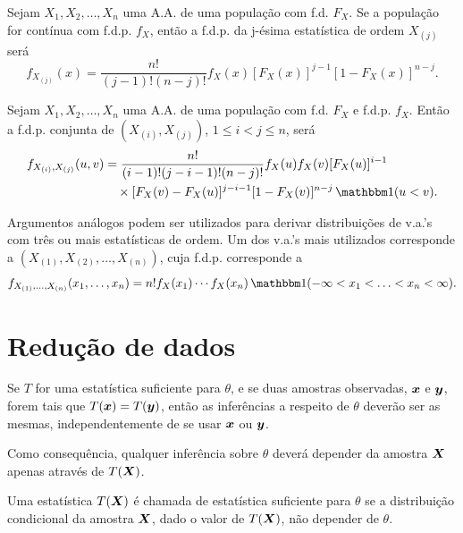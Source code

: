 \begin{theorem}[Contínua]
	Sejam $X_1, X_2, \ldots, X_n$ uma A.A. de uma população com f.d. $F_X$. Se a população for contínua com f.d.p. $f_X$, então a f.d.p. da j-ésima estatística de ordem $X_{(j)}$ será
	\[
	f_{X_{(j)}}(x) = \frac{n!}{(j-1)!(n-j)!} f_X(x) [F_X(x)]^{j-1} [1 - F_X(x)]^{n-j}.
	\]
\end{theorem}

\begin{theorem}[Contínua]
	Sejam $X_1, X_2, \ldots, X_n$ uma A.A. de uma população com f.d. $F_X$ e f.d.p. $f_X$. Então a f.d.p. conjunta de $(X_{(i)}, X_{(j)})$, $1 \leq i < j \leq n$, será
	\begin{align*}
		f_{X_{(i)}, X_{(j)}}(u, v) &= \frac{n!}{(i-1)!(j-i-1)!(n-j)!} f_X(u) f_X(v) [F_X(u)]^{i-1} \\
		&\quad \times [F_X(v) - F_X(u)]^{j-i-1} [1 - F_X(v)]^{n-j} \ind(u < v).
	\end{align*}
	\begin{note}
		Argumentos análogos podem ser utilizados para derivar distribuições de v.a.'s com três ou mais estatísticas de ordem. Um dos v.a.'s mais utilizados corresponde a $(X_{(1)}, X_{(2)}, \ldots, X_{(n)})$, cuja f.d.p. corresponde a
		\[
		f_{X_{(1)}, \ldots, X_{(n)}}(x_1, \ldots, x_n) = n! f_X(x_1) \cdots f_X(x_n) \ind(-\infty < x_1 < \ldots < x_n < \infty).
		\]
	\end{note}
\end{theorem}

\section{Redução de dados}

\begin{definition}
	Se $T$ for uma estatística suficiente para $\theta$, e se duas amostras observadas, $\bm{x}$ e $\bm{y}$, forem tais que $T(\bm{x}) = T(\bm{y})$, então as inferências a respeito de $\theta$ deverão ser as mesmas, independentemente de se usar $\bm{x}$ ou $\bm{y}$.
	
	\begin{note}
		Como consequência, qualquer inferência sobre $\theta$ deverá depender da amostra $\bm{X}$ apenas através de $T(\bm{X})$.
	\end{note}
\end{definition}

\begin{definition}
	Uma estatística $T(\bm{X})$ é chamada de estatística suficiente para $\theta$ se a distribuição condicional da amostra $\bm{X}$, dado o valor de $T(\bm{X})$, não depender de $\theta$.
\end{definition}

